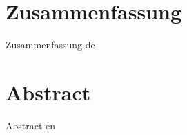 \cleardoublepage


\chapter{Zusammenfassung}

Zusammenfassung de

\chapter{Abstract}
Abstract en

\cleardoublepage

\pagestyle{headings}
\tableofcontents


